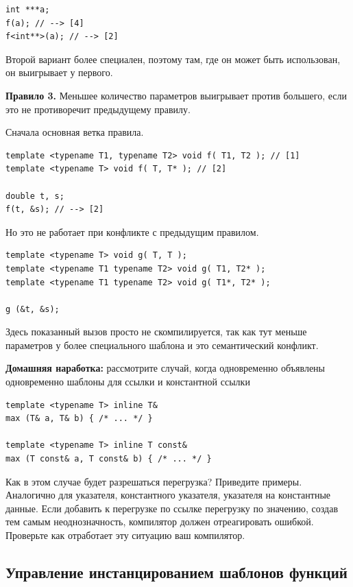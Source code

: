 \documentclass[a4paper,12pt,oneside]{book}
\begin{document}
\begin{lstlisting}
int ***a;
f(a); // --> [4]
f<int**>(a); // --> [2] 
\end{lstlisting}

Второй вариант более специален, поэтому там, где он может быть использован, он выигрывает у первого.

\textbf{Правило 3.} Меньшее количество параметров выигрывает против большего, если это не противоречит предыдущему правилу.

Сначала основная ветка правила.

\begin{lstlisting}
template <typename T1, typename T2> void f( T1, T2 ); // [1]
template <typename T> void f( T, T* ); // [2]

double t, s;
f(t, &s); // --> [2]
\end{lstlisting}

Но это не работает при конфликте с предыдущим правилом.

\begin{lstlisting}
template <typename T> void g( T, T ); 
template <typename T1 typename T2> void g( T1, T2* ); 
template <typename T1 typename T2> void g( T1*, T2* );

g (&t, &s);
\end{lstlisting}

Здесь показанный вызов просто не скомпилируется, так как тут меньше параметров у более специального шаблона и это семантический конфликт.

\textbf{Домашняя наработка:} рассмотрите случай, когда одновременно объявлены одновременно шаблоны для ссылки и константной ссылки

\begin{lstlisting}
template <typename T> inline T& 
max (T& a, T& b) { /* ... */ }

template <typename T> inline T const& 
max (T const& a, T const& b) { /* ... */ }
\end{lstlisting}

Как в этом случае будет разрешаться перегрузка? Приведите примеры. Аналогично для указателя, константного указателя, указателя на константные данные. Если добавить к перегрузке по ссылке перегрузку по значению, создав тем самым неоднозначность, компилятор должен отреагировать ошибкой. Проверьте как отработает эту ситуацию ваш компилятор.

\subsection{Управление инстанцированием шаблонов функций}\label{InstancingFuncs}
\end{document}
